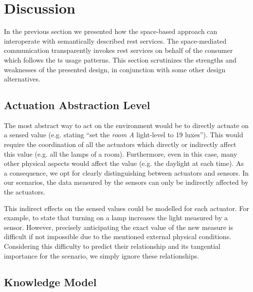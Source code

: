 \section{Discussion}
\label{sec:actuation_discussion}


In the previous section we presented how the space-based approach can interoperate with semantically described \ac{rest} services.
The space-mediated communication transparently invokes \ac{rest} services on behalf of the consumer which follows the \ac{ts} usage patterns.
This section scrutinizes the strengths and weaknesses of the presented design, in conjunction with some other design alternatives. %




\subsection{Actuation Abstraction Level}

The most abstract way to act on the environment would be to directly actuate on a sensed value (e.g. stating ``set the \emph{room A} light-level to 19 luxes'').
This would require the coordination of all the actuators which directly or indirectly affect this value (e.g. all the lamps of a room).
Furthermore, even in this case, many other physical aspects would affect the value (e.g. the daylight at each time).
As a consequence, we opt for clearly distinguishing between actuators and sensors.
In our scenarios, the data measured by the sensors can only be indirectly affected by the actuators.


This indirect effects on the sensed values could be modelled for each actuator.
For example, to state that turning on a lamp increases the light measured by a sensor.
However, precisely anticipating the exact value of the new measure is difficult if not impossible due to the mentioned external physical conditions.
Considering this difficulty to predict their relationship and its tangential importance for the scenario, we simply ignore these relationships.


\subsection{Knowledge Model}

